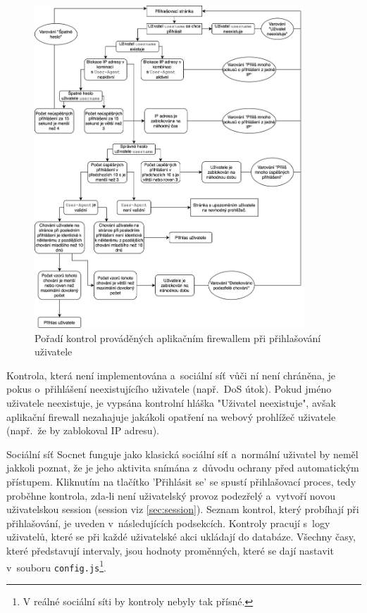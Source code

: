 \begin{figure}[ht]
	\centering
	\includegraphics[width=0.9\textwidth]{images/program_scheme.jpg}
	\caption{Pořadí kontrol prováděných aplikačním firewallem při přihlašování uživatele}
	\label{img:program_scheme}
\end{figure}

Kontrola, která není implementována a~sociální síť vůči ní není chráněna, je pokus o~přihlášení neexistujícího uživatele (např.~DoS útok). Pokud jméno uživatele neexistuje, je vypsána kontrolní hláška "Uživatel neexistuje", avšak aplikační firewall nezahajuje jakákoli opatření na webový prohlížeč uživatele (např.~že by zablokoval IP adresu).

Sociální síť Socnet funguje jako klasická sociální síť a~normální uživatel by neměl jakkoli poznat, že je jeho aktivita snímána z~důvodu ochrany před automatickým přístupem. Kliknutím na tlačítko 'Přihlásit se' se spustí přihlašovací proces, tedy proběhne kontrola, zda-li není uživatelský provoz podezřelý a~vytvoří novou uživatelskou session (session viz \ref{sec:session}). Seznam kontrol, který probíhají při přihlašování, je uveden v~následujících podsekcích. Kontroly pracují s~logy uživatelů, které se při každé uživatelské akci ukládají do databáze. Všechny časy, které představují intervaly, jsou hodnoty proměnných, které se dají nastavit v~souboru \texttt{config.js}\footnote{V reálné sociální síti by kontroly nebyly tak přísné.}.

